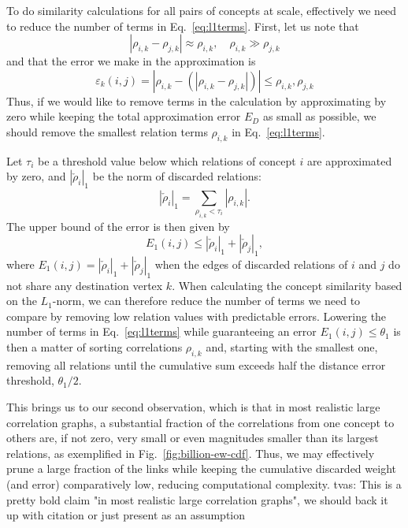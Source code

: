 \documentclass{sig-alternate}
\newcommand{\comment}[1]{{\small \color{red} {#1}} \normalcolor}
\newcommand{\rn}[1]{\rho_{#1}}
\newcommand{\mrn}[1]{\tau_{#1}}
\newcommand{\drns}[1]{|\check{\rho}_{#1}|_1}
\begin{document}
To do similarity calculations for all pairs of concepts at scale, effectively we need to reduce the number of terms in Eq.\ \ref{eq:l1terms}. First, let us note that
\begin{equation}
\label{eq:corrapprox}
| \rn{i,k} - \rn{j,k} | \approx \rn{i,k}, \quad \rn{i,k} \gg \rn{j,k}
\end{equation}
and that the error we make in the approximation is
\begin{equation}
\label{eq:corrapproxbound}
\varepsilon_k(i, j) = | \rn{i,k} - (| \rn{i,k} - \rn{j,k} | ) | \leq \rn{i,k}, \rn{j,k}
\end{equation}
Thus, if we would like to remove terms in the calculation by approximating by zero while keeping the total approximation error $E_D$ as small as possible, we should remove the smallest relation terms $\rn{i,k}$ in Eq.\ \ref{eq:l1terms}.

Let $\mrn{i}$ be a threshold value below which relations of concept $i$ are approximated by zero, and $\drns{i}$ be the norm of discarded relations:
\begin{equation} \label{}
\drns{i} = \sum_{ \rn{i,k} < \mrn{i}} |\rn{i,k}|.
\end{equation}
The upper bound of the error is then given by
\begin{equation} \label{eq:errbound}
E_1(i,j) \leq \drns{i} + \drns{j},
\end{equation}
where $E_1(i,j)=\drns{i} + \drns{j}$ when the edges of discarded relations of $i$ and $j$ do not share any destination
vertex $k$. When calculating the concept similarity based on the $L_1$-norm, we can therefore reduce the number of
terms we need to compare by removing low relation values with predictable errors. Lowering the number of terms in
Eq.\ \ref{eq:l1terms} while guaranteeing an error $E_1(i,j) \leq \theta_1$ is then a matter of sorting correlations
$\rn{i,k}$ and, starting with the smallest one, removing all relations until the cumulative sum exceeds half the
distance error threshold, $\theta_1/2$.

This brings us to our second observation, which is that in most realistic large correlation graphs, a substantial fraction of
the correlations from one concept to others are, if not zero, very small or even magnitudes smaller than its largest
relations, as exemplified in Fig.\ \ref{fig:billion-ew-cdf}. Thus, we may effectively prune a
large fraction of the links while keeping the cumulative discarded weight (and error) comparatively low, reducing
computational complexity. \comment{tvas: This is a pretty bold claim "in most realistic large correlation graphs", we should back it up with citation or just present as an assumption}
\end{document}
